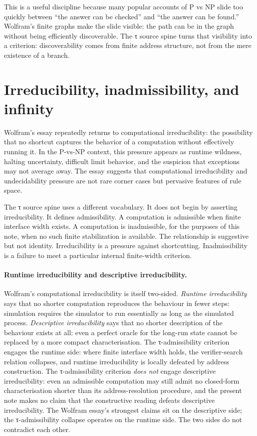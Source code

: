 \documentclass{pantarhei-researchnote}
\begin{document}
This is a useful discipline because many popular accounts of P vs NP
slide too quickly between ``the answer can be checked'' and ``the answer
can be found.'' Wolfram's finite graphs make the slide visible: the path
can be in the graph without being efficiently discoverable. The τ source
spine turns that visibility into a criterion: discoverability comes from
finite address structure, not from the mere existence of a branch.

\section{Irreducibility, inadmissibility, and infinity}
\label{sec:irreducibility}

Wolfram's essay repeatedly returns to computational irreducibility: the
possibility that no shortcut captures the behavior of a computation
without effectively running it. In the P-vs-NP context, this pressure
appears as runtime wildness, halting uncertainty, difficult limit behavior,
and the suspicion that exceptions may not average away. The essay suggests
that computational irreducibility and undecidability pressure are not rare
corner cases but pervasive features of rule space.

The τ source spine uses a different vocabulary. It does not begin by
asserting irreducibility. It defines admissibility. A computation is
admissible when finite interface width exists. A computation is
inadmissible, for the purposes of this note, when no such finite
stabilization is available. The relationship is suggestive but not
identity. Irreducibility is a pressure against shortcutting. Inadmissibility
is a failure to meet a particular internal finite-width criterion.

\paragraph{Runtime irreducibility and descriptive irreducibility.}
Wolfram's computational irreducibility is itself two-sided. \emph{Runtime
irreducibility} says that no shorter computation reproduces the behaviour
in fewer steps: simulation requires the simulator to run essentially as
long as the simulated process. \emph{Descriptive irreducibility} says that
no shorter description of the behaviour exists at all: even a perfect
oracle for the long-run state cannot be replaced by a more compact
characterisation. The τ-admissibility criterion engages the runtime side:
where finite interface width holds, the verifier-search relation
collapses, and runtime irreducibility is locally defeated by address
construction. The τ-admissibility criterion \emph{does not} engage
descriptive irreducibility: even an admissible computation may still
admit no closed-form characterisation shorter than its address-resolution
procedure, and the present note makes no claim that the constructive
reading defeats descriptive irreducibility. The Wolfram essay's strongest
claims sit on the descriptive side; the τ-admissibility collapse
operates on the runtime side. The two sides do not contradict each
other.
\end{document}
